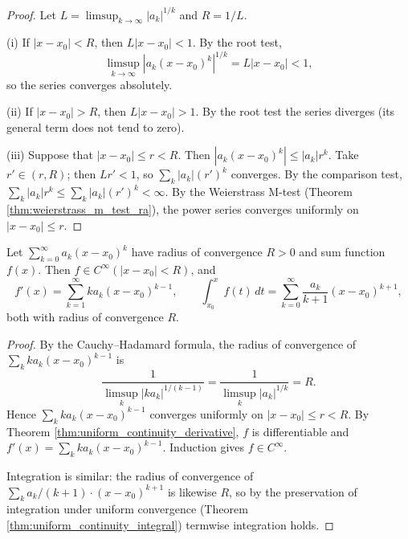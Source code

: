 \begin{proof}
Let $L = \limsup_{k \to \infty} |a_k|^{1/k}$ and $R = 1/L$.

(i) If $|x - x_0| < R$, then $L |x - x_0| < 1$. By the root test,
\[
\limsup_{k \to \infty} |a_k (x - x_0)^k|^{1/k} = L |x - x_0| < 1,
\]
so the series converges absolutely.

(ii) If $|x - x_0| > R$, then $L |x - x_0| > 1$. By the root test the series diverges (its general term does not tend to zero).

(iii) Suppose that $|x - x_0| \le r < R$. Then $|a_k (x - x_0)^k| \le |a_k| r^k$. Take $r' \in (r, R)$; then $L r' < 1$, so $\sum_k |a_k| (r')^k$ converges. By the comparison test, $\sum_k |a_k| r^k \le \sum_k |a_k| (r')^k < \infty$. By the Weierstrass M-test (Theorem \ref{thm:weierstrass_m_test_ra}), the power series converges uniformly on $|x - x_0| \le r$.
\end{proof}

\begin{theorem}\label{thm:power_series_termwise}
Let $\sum_{k=0}^{\infty} a_k (x - x_0)^k$ have radius of convergence $R > 0$ and sum function $f(x)$. Then $f \in C^\infty(|x - x_0| < R)$, and
\[
f'(x) = \sum_{k=1}^{\infty} k a_k (x - x_0)^{k-1}, \qquad
\int_{x_0}^{x} f(t) \, dt = \sum_{k=0}^{\infty} \frac{a_k}{k+1} (x - x_0)^{k+1},
\]
both with radius of convergence $R$.
\end{theorem}

\begin{proof}
By the Cauchy--Hadamard formula, the radius of convergence of $\sum_k k a_k (x - x_0)^{k-1}$ is
\[
\frac{1}{\limsup_k |k a_k|^{1/(k-1)}} = \frac{1}{\limsup_k |a_k|^{1/k}} = R.
\]
Hence $\sum_k k a_k (x - x_0)^{k-1}$ converges uniformly on $|x - x_0| \le r < R$. By Theorem \ref{thm:uniform_continuity_derivative}, $f$ is differentiable and $f'(x) = \sum_k k a_k (x - x_0)^{k-1}$. Induction gives $f \in C^\infty$.

Integration is similar: the radius of convergence of $\sum_k a_k/(k+1) \cdot (x - x_0)^{k+1}$ is likewise $R$, so by the preservation of integration under uniform convergence (Theorem \ref{thm:uniform_continuity_integral}) termwise integration holds.
\end{proof}

